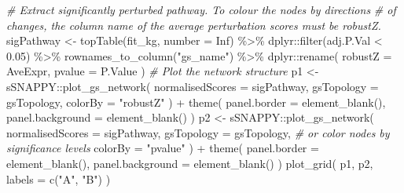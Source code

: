 \documentclass[9pt,a4paper,]{extarticle}
\newenvironment{Shaded}{\begin{snugshade}}{\end{snugshade}}
\newcommand{\AttributeTok}[1]{\textcolor[rgb]{0.77,0.63,0.00}{#1}}
\newcommand{\CommentTok}[1]{\textcolor[rgb]{0.56,0.35,0.01}{\textit{#1}}}
\newcommand{\ConstantTok}[1]{\textcolor[rgb]{0.00,0.00,0.00}{#1}}
\newcommand{\FloatTok}[1]{\textcolor[rgb]{0.00,0.00,0.81}{#1}}
\newcommand{\FunctionTok}[1]{\textcolor[rgb]{0.00,0.00,0.00}{#1}}
\newcommand{\NormalTok}[1]{#1}
\newcommand{\OtherTok}[1]{\textcolor[rgb]{0.56,0.35,0.01}{#1}}
\newcommand{\SpecialCharTok}[1]{\textcolor[rgb]{0.00,0.00,0.00}{#1}}
\newcommand{\StringTok}[1]{\textcolor[rgb]{0.31,0.60,0.02}{#1}}
\begin{document}
\begin{Shaded}
\begin{Highlighting}[]
\CommentTok{\# Extract significantly perturbed pathway. To colour the nodes by directions }
\CommentTok{\# of changes, the column name of the average perturbation scores must be robustZ. }
\NormalTok{sigPathway }\OtherTok{\textless{}{-}} \FunctionTok{topTable}\NormalTok{(fit\_kg, }\AttributeTok{number =} \ConstantTok{Inf}\NormalTok{) }\SpecialCharTok{\%\textgreater{}\%} 
\NormalTok{    dplyr}\SpecialCharTok{::}\FunctionTok{filter}\NormalTok{(adj.P.Val }\SpecialCharTok{\textless{}} \FloatTok{0.05}\NormalTok{) }\SpecialCharTok{\%\textgreater{}\%}
    \FunctionTok{rownames\_to\_column}\NormalTok{(}\StringTok{"gs\_name"}\NormalTok{) }\SpecialCharTok{\%\textgreater{}\%}
\NormalTok{    dplyr}\SpecialCharTok{::}\FunctionTok{rename}\NormalTok{(}
        \AttributeTok{robustZ =}\NormalTok{ AveExpr,}
        \AttributeTok{pvalue =}\NormalTok{ P.Value}
\NormalTok{    ) }
\CommentTok{\# Plot the network structure}
\NormalTok{p1 }\OtherTok{\textless{}{-}}\NormalTok{ sSNAPPY}\SpecialCharTok{::}\FunctionTok{plot\_gs\_network}\NormalTok{(}
    \AttributeTok{normalisedScores =}\NormalTok{ sigPathway,}
    \AttributeTok{gsTopology =}\NormalTok{ gsTopology, }
    \AttributeTok{colorBy =} \StringTok{"robustZ"}
\NormalTok{) }\SpecialCharTok{+}
    \FunctionTok{theme}\NormalTok{(}
        \AttributeTok{panel.border =} \FunctionTok{element\_blank}\NormalTok{(), }
        \AttributeTok{panel.background =} \FunctionTok{element\_blank}\NormalTok{()}
\NormalTok{    )}
\NormalTok{p2 }\OtherTok{\textless{}{-}}\NormalTok{ sSNAPPY}\SpecialCharTok{::}\FunctionTok{plot\_gs\_network}\NormalTok{(}
    \AttributeTok{normalisedScores =}\NormalTok{ sigPathway,}
    \AttributeTok{gsTopology =}\NormalTok{ gsTopology, }
    \CommentTok{\# or color nodes by significance levels}
    \AttributeTok{colorBy  =} \StringTok{"pvalue"}
\NormalTok{) }\SpecialCharTok{+}
    \FunctionTok{theme}\NormalTok{(}
        \AttributeTok{panel.border =} \FunctionTok{element\_blank}\NormalTok{(), }
        \AttributeTok{panel.background =} \FunctionTok{element\_blank}\NormalTok{()}
\NormalTok{    )}
\FunctionTok{plot\_grid}\NormalTok{(}
\NormalTok{    p1, p2, }
    \AttributeTok{labels =} \FunctionTok{c}\NormalTok{(}\StringTok{"A"}\NormalTok{, }\StringTok{"B"}\NormalTok{)}
\NormalTok{)}
\end{Highlighting}
\end{Shaded}
\end{document}
